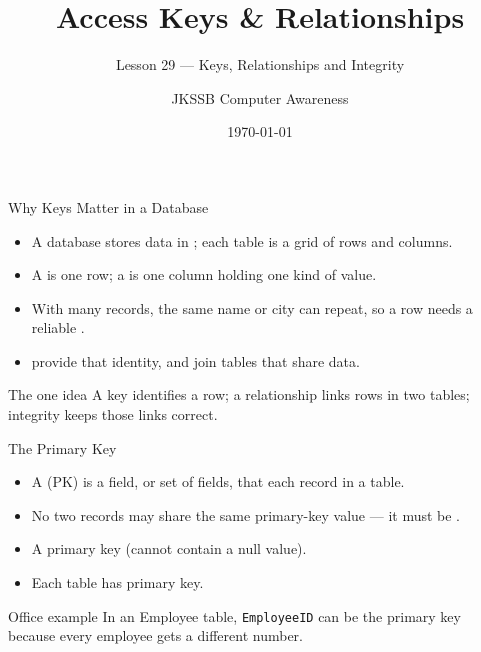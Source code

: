 \documentclass[aspectratio=169]{beamer}
\title{Access Keys \& Relationships}
\subtitle{Lesson 29 --- Keys, Relationships and Integrity}
\author{JKSSB Computer Awareness}
\date{\today}
\begin{document}
\frame{\titlepage}

\begin{frame}{Why Keys Matter in a Database}
  \begin{itemize}
    \item A database stores data in ; each table is a grid of
      rows and columns.
    \item A  is one row; a  is one column holding one
      kind of value.
    \item With many records, the same name or city can repeat, so a row needs
      a reliable .
    \item {} provide that identity, and  join
      tables that share data.
  \end{itemize}
  \begin{block}{The one idea}
    A key identifies a row; a relationship links rows in two tables; integrity
    keeps those links correct.
  \end{block}
\end{frame}

\begin{frame}{The Primary Key}
  \begin{itemize}
    \item A  (PK) is a field, or set of fields, that
       each record in a table.
    \item No two records may share the same primary-key value --- it must be
      .
    \item A primary key  (cannot contain a null
      value).
    \item Each table has  primary key.
  \end{itemize}
  \begin{exampleblock}{Office example}
    In an Employee table, \texttt{EmployeeID} can be the primary key because
    every employee gets a different number.
  \end{exampleblock}
\end{frame}
\end{document}
